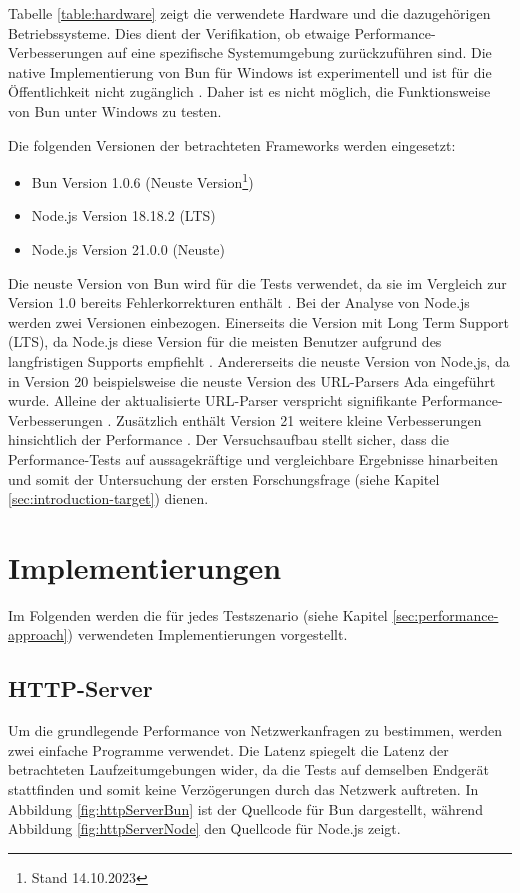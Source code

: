 \noindent
Tabelle \ref{table:hardware} zeigt die verwendete Hardware und die dazugehörigen Betriebssysteme. Dies dient der Verifikation, ob etwaige Performance-Verbesserungen auf eine spezifische Systemumgebung zurückzuführen sind. Die native Implementierung von Bun für Windows ist experimentell und ist für die Öffentlichkeit nicht zugänglich \cite{Verhelst.2023}. Daher ist es nicht möglich, die Funktionsweise von Bun unter Windows zu testen.

\noindent
Die folgenden Versionen der betrachteten Frameworks werden eingesetzt:
\begin{itemize}
	\item Bun Version 1.0.6 (Neuste Version\footnote{Stand 14.10.2023\label{footnote:Stand}})
	\item Node.js Version 18.18.2 (LTS)
	\item Node.js Version 21.0.0 (Neuste)
\end{itemize}

\noindent
Die neuste Version von Bun wird für die Tests verwendet, da sie im Vergleich zur Version 1.0 bereits Fehlerkorrekturen enthält \cite{Sumner.2023b}. Bei der Analyse von Node.js werden zwei Versionen einbezogen. Einerseits die Version mit Long Term Support (LTS), da Node.js diese Version für die meisten Benutzer aufgrund des langfristigen Supports empfiehlt \cite{OpenJSFoundation.o.J.}. Andererseits die neuste Version von Node,js, da in Version 20 beispielsweise die neuste Version des URL-Parsers Ada eingeführt wurde. Alleine der aktualisierte URL-Parser verspricht signifikante Performance-Verbesserungen \cite{OpenJSFoundation.2023}. Zusätzlich enthält Version 21 weitere kleine Verbesserungen hinsichtlich der Performance \cite{OpenJSFoundation.2023b}. \newline
Der Versuchsaufbau stellt sicher, dass die Performance-Tests auf aussagekräftige und vergleichbare Ergebnisse hinarbeiten und somit der Untersuchung der ersten Forschungsfrage (siehe Kapitel \ref{sec:introduction-target}) dienen.

\section{Implementierungen} \label{sec:performance-implementations}
Im Folgenden werden die für jedes Testszenario (siehe Kapitel \ref{sec:performance-approach}) verwendeten Implementierungen vorgestellt.

\subsection{HTTP-Server} \label{subsec:httpServer}
Um die grundlegende Performance von Netzwerkanfragen zu bestimmen, werden zwei einfache Programme verwendet. Die Latenz spiegelt die Latenz der betrachteten Laufzeitumgebungen wider, da die Tests auf demselben Endgerät stattfinden und somit keine Verzögerungen durch das Netzwerk auftreten. In Abbildung \ref{fig:httpServerBun} ist der Quellcode für Bun dargestellt, während Abbildung \ref{fig:httpServerNode} den Quellcode für Node.js zeigt.

